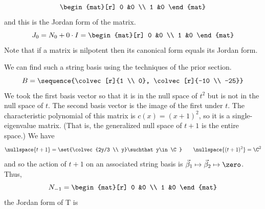 \begin{exercises}
\begin{answer}
\begin{exparts}
\begin{equation*}
\begin{mat}[r]
               0  &0  \\
               1  &0
            \end{mat}
           \end{equation*}
           and this is the Jordan form of the matrix.
           \begin{equation*}
             J_0=N_0+0\cdot I=
             \begin{mat}[r]
               0  &0  \\
               1  &0
            \end{mat}
           \end{equation*}
           Note that if a matrix is nilpotent then its canonical form
           equals its Jordan form.

           We can find such a string basis using the techniques of the 
           prior section.
           \begin{equation*}
                 B=\sequence{\colvec[r]{1 \\ 0},
                             \colvec[r]{-10 \\ -25}}
           \end{equation*}
           We took the first basis vector so that it is in
           the null space of $t^2$ but is not in the null space of $t$.
           The second basis vector is the image of the first under $t$.
        \partsitem The characteristic polynomial of this matrix
           is \( c(x)=(x+1)^2 \), so it is a single-eigenvalue matrix.
           (That is, the generalized null space of $t+1$ is the entire
           space.) 
           We have
           \begin{equation*}
             \nullspace{t+1}=\set{\colvec{2y/3 \\ y}\suchthat
                                     y\in\C} 
             \qquad
             \nullspace{(t+1)^2}=\C^2 
           \end{equation*}
           and so the action of $t+1$ on
           an associated string basis is 
           $\vec{\beta}_1\mapsto\vec{\beta}_2\mapsto\zero$.
           Thus, 
           \begin{equation*}
             N_{-1}
             =
             \begin{mat}[r]
                0  &0  \\
                1  &0 
             \end{mat}
           \end{equation*}
           the Jordan form of T is
           \begin{equation*}

\end{equation*}
\end{exparts}
\end{answer}
\end{exercises}
